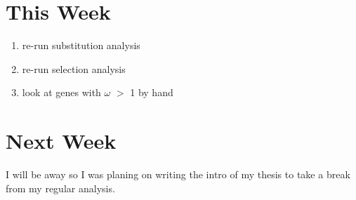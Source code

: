 \documentclass[12pt]{article}
\begin{document}

\section*{This Week}
%
\begin{enumerate}
	\item re-run substitution analysis
	\item re-run selection analysis
	\item look at genes with $\omega$ $>$ 1 by hand
\end{enumerate}


\section*{Next Week}
I will be away so I was planing on writing the intro of my thesis to take a break from my regular analysis.

\newpage

\end{document}
